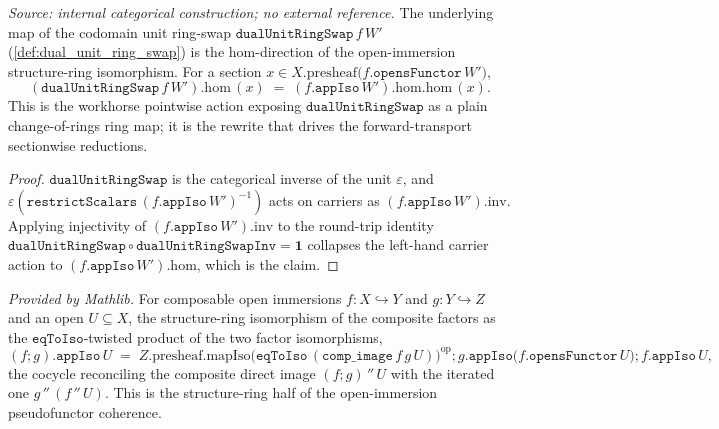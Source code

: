 \begin{lemma}\leanok
  \label{lem:dual_unit_ring_swap_apply}
  \textit{Source: internal categorical construction; no external reference.}
  The underlying map of the codomain unit ring-swap \(\mathtt{dualUnitRingSwap}\,f\,W'\)
  (\cref{def:dual_unit_ring_swap}) is the \(\mathrm{hom}\)-direction of the open-immersion structure-ring
  isomorphism. For a section \(x \in X.\mathrm{presheaf}\bigl(f.\mathtt{opensFunctor}\,W'\bigr)\),
  \[
    (\mathtt{dualUnitRingSwap}\,f\,W').\mathrm{hom}\,(x)
      \;=\; (f.\mathtt{appIso}\,W').\mathrm{hom}.\mathrm{hom}\,(x).
  \]
  This is the workhorse pointwise action exposing \(\mathtt{dualUnitRingSwap}\) as a plain
  change-of-rings ring map; it is the rewrite that drives the forward-transport sectionwise reductions.
\end{lemma}
\begin{proof}
  \leanok
  \(\mathtt{dualUnitRingSwap}\) is the categorical inverse of the unit \(\varepsilon\), and
  \(\varepsilon(\mathtt{restrictScalars}\,(f.\mathtt{appIso}\,W')^{-1})\) acts on carriers as
  \((f.\mathtt{appIso}\,W').\mathrm{inv}\). Applying injectivity of \((f.\mathtt{appIso}\,W').\mathrm{inv}\)
  to the round-trip identity \(\mathtt{dualUnitRingSwap} \circ \mathtt{dualUnitRingSwapInv} = \mathbf 1\)
  collapses the left-hand carrier action to \((f.\mathtt{appIso}\,W').\mathrm{hom}\), which is the claim.
\end{proof}

\begin{lemma}
  \label{lem:scheme_modules_comp_appiso}
  \mathlibok
  \textit{Provided by Mathlib.}
  For composable open immersions \(f : X \hookrightarrow Y\) and \(g : Y \hookrightarrow Z\) and an open
  \(U \subseteq X\), the structure-ring isomorphism of the composite factors as the
  \(\mathtt{eqToIso}\)-twisted product of the two factor isomorphisms,
  \[
    (f \mathbin{;} g).\mathtt{appIso}\,U
      \;=\; Z.\mathrm{presheaf}.\mathrm{mapIso}\bigl(\mathtt{eqToIso}\,
        (\mathtt{comp\_image}\,f\,g\,U)\bigr)^{\mathrm{op}}
        \mathbin{;} g.\mathtt{appIso}\bigl(f.\mathtt{opensFunctor}\,U\bigr) \mathbin{;} f.\mathtt{appIso}\,U,
  \]
  the cocycle reconciling the composite direct image \((f\mathbin{;}g)\,''\,U\) with the iterated one
  \(g\,''\,(f\,''\,U)\). This is the structure-ring half of the open-immersion pseudofunctor coherence.
\end{lemma}

